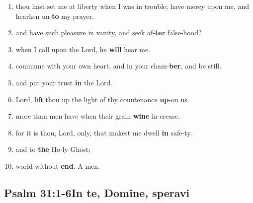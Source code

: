 \documentclass[10pt]{article}
\begin{document}
\begin{enumerate}[
    leftmargin=*,
    label=\textsc { \arabic * }
]
    \item {}
        {thou hast set me at liberty when I was in trouble; have mercy upon me, and hearken un-\textbf{to} my prayer.}

    \item {}
        {and have such pleasure in vanity, and seek af-\textbf{ter} false-hood?}

    \item {}
        {when I call upon the Lord, he \textbf{will} hear me.}

    \item {}
        {commune with your own heart, and in your cham-\textbf{ber}, and be still.}

    \item {}
        {and put your trust \textbf{in} the Lord.}

    \item {}
        {Lord, lift thou up the light of thy countenance \textbf{up}-on us.}

    \item {}
        {more than men have when their grain \textbf{wine} in-crease.}

    \item {}
        {for it is thou, Lord, only, that makest me dwell \textbf{in} safe-ty.}

    \item[] 
        {and to \textbf{the} Ho-ly Ghost;}

    \item[] 
        {world without \textbf{end}. A-men.}
\end{enumerate}

\subsection*{Psalm 31:1-6\quad In te, Domine, speravi}
\end{document}
